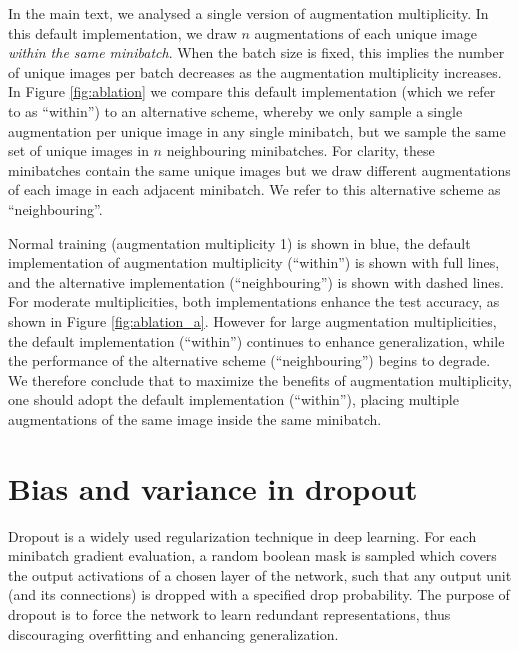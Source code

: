 \documentclass{article}
\begin{document}
In the main text, we analysed a single version of augmentation multiplicity. In this default implementation, we draw $n$ augmentations of each unique image \textit{within the same minibatch}. When the batch size is fixed, this implies the number of unique images per batch decreases as the augmentation multiplicity increases. In Figure \ref{fig:ablation} we compare this default implementation (which we refer to as ``within'') to an alternative scheme, whereby we only sample a single augmentation per unique image in any single minibatch, but we sample the same set of unique images in $n$ neighbouring minibatches. For clarity, these minibatches contain the same unique images but we draw different augmentations of each image in each adjacent minibatch. We refer to this alternative scheme as ``neighbouring''.

Normal training (augmentation multiplicity 1) is shown in blue, the default implementation of augmentation multiplicity (``within'') is shown with full lines, and the alternative implementation (``neighbouring'') is shown with dashed lines. For moderate multiplicities, both implementations enhance the test accuracy, as shown in Figure \ref{fig:ablation_a}. However for large augmentation multiplicities, the default implementation (``within'') continues to enhance generalization, while the performance of the alternative scheme (``neighbouring'') begins to degrade. We therefore conclude that to maximize the benefits of augmentation multiplicity, one should adopt the default implementation (``within''), placing multiple augmentations of the same image inside the same minibatch.

\section{Bias and variance in dropout}
\label{app:dropout}
Dropout \citep{srivastava2014dropout} is a widely used regularization technique in deep learning. For each minibatch gradient evaluation, a random boolean mask is sampled which covers the output activations of a chosen layer of the network, such that any output unit (and its connections) is dropped with a specified drop probability. The purpose of dropout is to force the network to learn redundant representations, thus discouraging overfitting and enhancing generalization.
\end{document}
